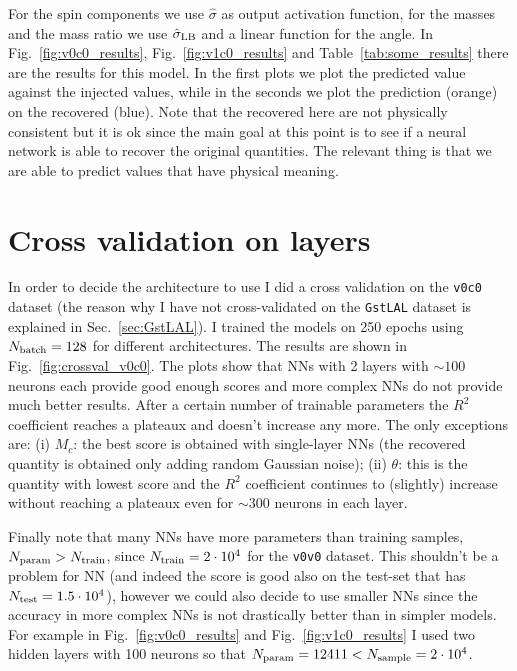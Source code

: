 \documentclass[prd,aps,twocolumn,a4paper,showkeys,nofootinbib]{article}
\begin{document}
For the spin components we use $\hat{\sigma}$ as output 
activation function, for the masses and the mass ratio we use $\hat{\sigma}_{\rm LB}$ and
a linear function for the angle. 
In Fig.~\ref{fig:v0c0_results}, Fig.~\ref{fig:v1c0_results} and Table~\ref{tab:some_results}
there are the results for this model.
In the first plots we plot the predicted value against the injected values, while in the seconds
we plot the prediction (orange) on the recovered (blue). Note that the recovered here are not 
physically consistent but it is ok since the main goal at this point 
is to see if a neural network is able to 
recover the original quantities. The relevant thing is that we are able to predict values
that have physical meaning.

\section{Cross validation on layers}
\label{sec:crossval}
In order to decide the architecture to use I did a cross validation on the 
\texttt{v0c0} dataset (the reason why I have not cross-validated on the \texttt{GstLAL} dataset
is explained in Sec.~\ref{sec:GstLAL}). I trained the models on 250 epochs using
$N_{\rm batch}=128$ for different architectures. The results are shown 
in Fig.~\ref{fig:crossval_v0c0}. The plots show that NNs with 2 layers with $\sim 100$ 
neurons each provide good enough scores and more complex NNs do not provide much better results. 
After a certain number of trainable parameters the $R^2$ coefficient reaches a plateaux 
and doesn't increase any more. 
The only exceptions are: (i) $M_c$: the best score is obtained with single-layer NNs 
(the recovered quantity is obtained only adding random Gaussian noise); 
(ii) $\theta$: this is the quantity with lowest score and the $R^2$ coefficient 
continues to (slightly) increase without reaching a plateaux even for $\sim 300$
neurons in each layer. 

Finally note that many NNs have more parameters than training samples, 
$N_{\rm param}>N_{\rm train}$, since 
$N_{\rm train}=2\cdot 10^4$ for the \texttt{v0v0} dataset. This shouldn't be a problem 
for NN (and indeed the score is good also on the test-set that has 
$N_{\rm test}=1.5\cdot 10^4$), however we could also decide to use smaller NNs 
since the accuracy in more complex NNs is not drastically better than in simpler models. 
For example in Fig.~\ref{fig:v0c0_results} and Fig.~\ref{fig:v1c0_results} I used
two hidden layers with 100 neurons so that $N_{\rm param}=12411<N_{\rm sample}=2\cdot 10^4$.
\end{document}
